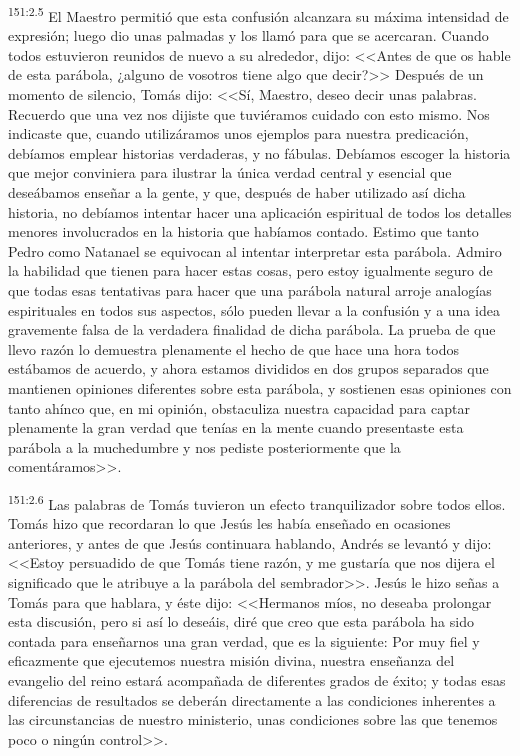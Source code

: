 \par 
\textsuperscript{151:2.5} El Maestro permitió que esta confusión alcanzara su máxima intensidad de expresión; luego dio unas palmadas y los llamó para que se acercaran. Cuando todos estuvieron reunidos de nuevo a su alrededor, dijo: <<Antes de que os hable de esta parábola, ¿alguno de vosotros tiene algo que decir?>> Después de un momento de silencio, Tomás dijo: <<Sí, Maestro, deseo decir unas palabras. Recuerdo que una vez nos dijiste que tuviéramos cuidado con esto mismo. Nos indicaste que, cuando utilizáramos unos ejemplos para nuestra predicación, debíamos emplear historias verdaderas, y no fábulas. Debíamos escoger la historia que mejor conviniera para ilustrar la única verdad central y esencial que deseábamos enseñar a la gente, y que, después de haber utilizado así dicha historia, no debíamos intentar hacer una aplicación espiritual de todos los detalles menores involucrados en la historia que habíamos contado. Estimo que tanto Pedro como Natanael se equivocan al intentar interpretar esta parábola. Admiro la habilidad que tienen para hacer estas cosas, pero estoy igualmente seguro de que todas esas tentativas para hacer que una parábola natural arroje analogías espirituales en todos sus aspectos, sólo pueden llevar a la confusión y a una idea gravemente falsa de la verdadera finalidad de dicha parábola. La prueba de que llevo razón lo demuestra plenamente el hecho de que hace una hora todos estábamos de acuerdo, y ahora estamos divididos en dos grupos separados que mantienen opiniones diferentes sobre esta parábola, y sostienen esas opiniones con tanto ahínco que, en mi opinión, obstaculiza nuestra capacidad para captar plenamente la gran verdad que tenías en la mente cuando presentaste esta parábola a la muchedumbre y nos pediste posteriormente que la comentáramos>>.

\par 
\textsuperscript{151:2.6} Las palabras de Tomás tuvieron un efecto tranquilizador sobre todos ellos. Tomás hizo que recordaran lo que Jesús les había enseñado en ocasiones anteriores, y antes de que Jesús continuara hablando, Andrés se levantó y dijo: <<Estoy persuadido de que Tomás tiene razón, y me gustaría que nos dijera el significado que le atribuye a la parábola del sembrador>>. Jesús le hizo señas a Tomás para que hablara, y éste dijo: <<Hermanos míos, no deseaba prolongar esta discusión, pero si así lo deseáis, diré que creo que esta parábola ha sido contada para enseñarnos una gran verdad, que es la siguiente: Por muy fiel y eficazmente que ejecutemos nuestra misión divina, nuestra enseñanza del evangelio del reino estará acompañada de diferentes grados de éxito; y todas esas diferencias de resultados se deberán directamente a las condiciones inherentes a las circunstancias de nuestro ministerio, unas condiciones sobre las que tenemos poco o ningún control>>.

